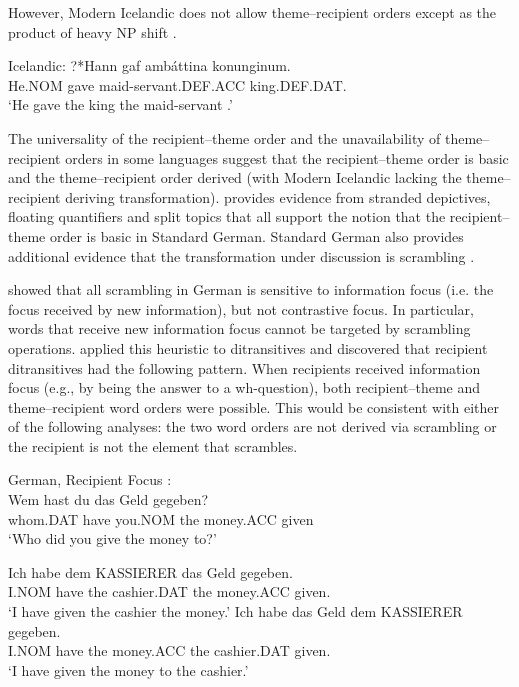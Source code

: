 	However, Modern Icelandic does not allow theme--recipient orders except as the product of heavy NP shift \citep{Dehe.2004}.

\begin{exe}
\ex Icelandic:
\gll ?*Hann gaf amb\'attina konunginum.\\
He.NOM gave maid-servant.DEF.ACC king.DEF.DAT. \\
\trans `He gave the king the maid-servant \citep[ex 14b]{Dehe.2004}.'
\end{exe}

The universality of the recipient--theme order and the unavailability of theme--recipient orders in some languages suggest that the recipient--theme order is basic and the theme--recipient order derived (with Modern Icelandic lacking the theme--recipient deriving transformation). \cite{Georgala.2011} provides evidence from stranded depictives, floating quantifiers and split topics that all support the notion that the recipient--theme order is basic in Standard German. Standard German also provides additional evidence that the transformation under discussion is scrambling \citep{Lenerz.1977,Abraham.1986,Webelhuth.1992,Choi.1996}.

\cite{Lenerz.1977} showed that all scrambling in German is sensitive to information focus (i.e. the focus received by new information), but not contrastive focus. In particular, words that receive new information focus cannot be targeted by scrambling operations. \cite{Lenerz.1977} applied this heuristic to ditransitives and discovered that recipient ditransitives had the following pattern. When recipients received information focus (e.g., by being the answer to a wh-question), both recipient--theme and theme--recipient word orders were possible. This would be consistent with either of the following analyses: the two word orders are not derived via scrambling or the recipient is not the element that scrambles.

\begin{exe}
\ex German, Recipient Focus \citep{Choi.1996}:\\
\gll Wem hast du das Geld gegeben?\\
whom.DAT have you.NOM the money.ACC given\\
\trans `Who did you give the money to?'
\begin{xlist}
\ex \gll Ich habe dem KASSIERER das Geld gegeben.\\
I.NOM have the cashier.DAT the money.ACC given.\\
\trans `I have given the cashier the money.'
\ex \gll Ich habe das Geld dem KASSIERER gegeben.\\
I.NOM have the money.ACC the cashier.DAT given.\\
\trans `I have given the money to the cashier.'
\end{xlist}
\end{exe}

